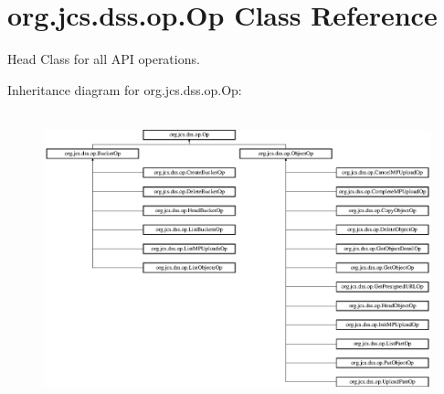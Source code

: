 \hypertarget{classorg_1_1jcs_1_1dss_1_1op_1_1Op}{}\section{org.\+jcs.\+dss.\+op.\+Op Class Reference}
\label{classorg_1_1jcs_1_1dss_1_1op_1_1Op}


Head Class for all A\+PI operations.  


Inheritance diagram for org.\+jcs.\+dss.\+op.\+Op\+:\begin{figure}[H]
\begin{center}
\leavevmode
\includegraphics[height=8.484848cm]{classorg_1_1jcs_1_1dss_1_1op_1_1Op}
\end{center}
\end{figure}
